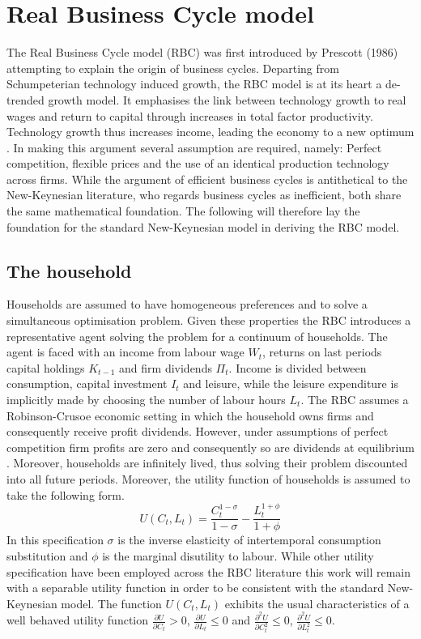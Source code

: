 \documentclass[12pt,a4paper,english]{article} %
\let\oldsection\section
\renewcommand\section{\clearpage\oldsection}
\begin{document}
	\section{Real Business Cycle model}
	The Real Business Cycle model (RBC) was first introduced by Prescott (1986) \cite{prescott_theory_1986} attempting to explain the origin of business cycles. Departing from Schumpeterian technology induced growth, the RBC model is at its heart a de-trended growth model. It emphasises the link between technology growth to real wages and return to capital through increases in total factor productivity. Technology growth thus increases income, leading the economy to a new optimum \cite{prescott_theory_1986}. 
	In making this argument several assumption are required, namely: Perfect competition, flexible prices and the use of an identical production technology across firms. While the argument of efficient business cycles is antithetical to the New-Keynesian literature, who regards business cycles as inefficient, both share the same mathematical foundation. The following will therefore lay the foundation for the standard New-Keynesian model in deriving the RBC model.
	
	\subsection{The household}
	Households are assumed to have homogeneous preferences and to solve a simultaneous optimisation problem. Given these properties the RBC introduces a representative agent solving the problem for a continuum of households.
	The agent is faced with an income from labour wage $W_t$, returns on last periods capital holdings $K_{t-1}$ and firm dividends $\Pi_t$. Income is divided between consumption, capital investment $I_t$ and leisure, while the leisure expenditure is implicitly made by choosing the number of labour hours $L_t$. The RBC assumes a Robinson-Crusoe economic setting in which the household owns firms and consequently receive profit dividends. However, under assumptions of perfect competition firm profits are zero and consequently so are dividends at equilibrium \cite{prescott_theory_1986}. 
	Moreover, households are infinitely lived, thus solving their problem discounted into all future periods. Moreover, the utility function of households is assumed to take the following form.
	\begin{equation}
		U(C_t, L_t) = \frac{C_t^{1-\sigma}}{{1-\sigma}} - \frac{L_t^{1+\phi}}{1+\phi} 
	\end{equation}
	In this specification $\sigma$ is the inverse elasticity of intertemporal consumption substitution and $\phi$ is the marginal disutility to labour. While other utility specification have been employed across the RBC literature this work will remain with a separable utility function in order to be consistent with the standard New-Keynesian model. The function $U(C_t, L_t)$ exhibits the usual characteristics of a well behaved utility function $\frac{\partial U}{\partial C_t} > 0$, $\frac{\partial U}{\partial L_t} \leq 0$ and $\frac{\partial^2 U}{\partial C_t^2} \leq 0$, $\frac{\partial^2 U}{\partial L_t^2} \leq 0$.
	
\end{document}
